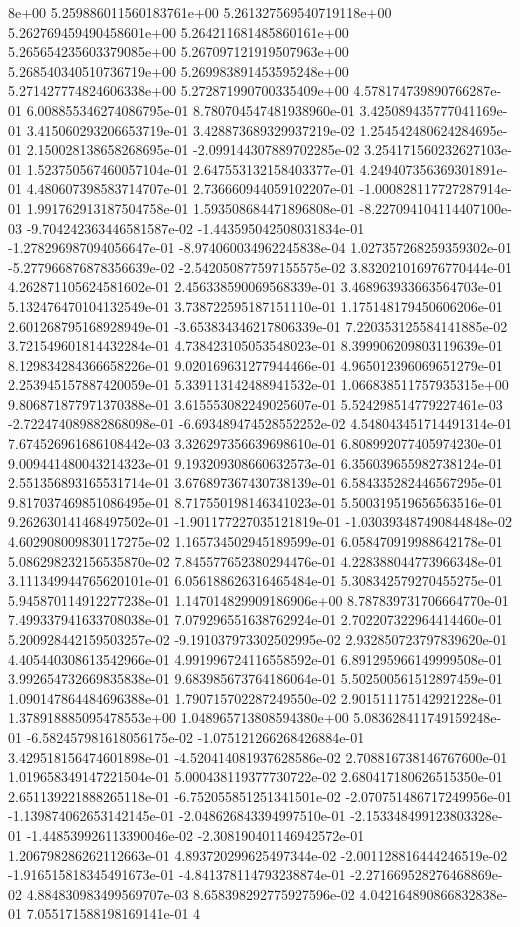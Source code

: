8e+00	5.259886011560183761e+00	5.261327569540719118e+00	5.262769459490458601e+00	5.264211681485860161e+00	5.265654235603379085e+00	5.267097121919507963e+00	5.268540340510736719e+00	5.269983891453595248e+00	5.271427774824606338e+00	5.272871990700335409e+00
4.578174739890766287e-01	6.008855346274086795e-01	8.780704547481938960e-01	3.425089435777041169e-01	3.415060293206653719e-01	3.428873689329937219e-02	1.254542480624284695e-01	2.150028138658268695e-01	-2.099144307889702285e-02	3.254171560232627103e-01	1.523750567460057104e-01	2.647553132158403377e-01	4.249407356369301891e-01	4.480607398583714707e-01	2.736660944059102207e-01	-1.000828117727287914e-01	1.991762913187504758e-01	1.593508684471896808e-01	-8.227094104114407100e-03	-9.704242363446581587e-02	-1.443595042508031834e-01	-1.278296987094056647e-01	-8.974060034962245838e-04	1.027357268259359302e-01	-5.277966876878356639e-02	-2.542050877597155575e-02	3.832021016976770444e-01	4.262871105624581602e-01	2.456338590069568339e-01	3.468963933663564703e-01	5.132476470104132549e-01	3.738722595187151110e-01	1.175148179450606206e-01	2.601268795168928949e-01	-3.653834346217806339e-01	7.220353125584141885e-02	3.721549601814432284e-01	4.738423105053548023e-01	8.399906209803119639e-01	8.129834284366658226e-01	9.020169631277944466e-01	4.965012396069651279e-01	2.253945157887420059e-01	5.339113142488941532e-01	1.066838511757935315e+00	9.806871877971370388e-01	3.615553082249025607e-01	5.524298514779227461e-03	-2.722474089882868098e-01	-6.693489474528552252e-02	4.548043451714491314e-01	7.674526961686108442e-03	3.326297356639698610e-01	6.808992077405974230e-01	9.009441480043214323e-01	9.193209308660632573e-01	6.356039655982738124e-01	2.551356893165531714e-01	3.676897367430738139e-01	6.584335282446567295e-01	9.817037469851086495e-01	8.717550198146341023e-01	5.500319519656563516e-01	9.262630141468497502e-01	-1.901177227035121819e-01	-1.030393487490844848e-02	4.602908009830117275e-02	1.165734502945189599e-01	6.058470919988642178e-01	5.086298232156535870e-02	7.845577652380294476e-01	4.228388044773966348e-01	3.111349944765620101e-01	6.056188626316465484e-01	5.308342579270455275e-01	5.945870114912277238e-01	1.147014829909186906e+00	8.787839731706664770e-01	7.499337941633708038e-01	7.079296551638762924e-01	2.702207322964414460e-01	5.200928442159503257e-02	-9.191037973302502995e-02	2.932850723797839620e-01	4.405440308613542966e-01	4.991996724116558592e-01	6.891295966149999508e-01	3.992654732669835838e-01	9.683985673764186064e-01	5.502500561512897459e-01	1.090147864484696388e-01	1.790715702287249550e-02	2.901511175142921228e-01	1.378918885095478553e+00	1.048965713808594380e+00	5.083628411749159248e-01	-6.582457981618056175e-02	-1.075121266268426884e-01	3.429518156474601898e-01	-4.520414081937628586e-02	2.708816738146767600e-01	1.019658349147221504e-01	5.000438119377730722e-02	2.680417180626515350e-01	2.651139221888265118e-01	-6.752055851251341501e-02	-2.070751486717249956e-01	-1.139874062653142145e-01	-2.048626843394997510e-01	-2.153348499123803328e-01	-1.448539926113390046e-02	-2.308190401146942572e-01	1.206798286262112663e-01	4.893720299625497344e-02	-2.001128816444246519e-02	-1.916515818345491673e-01	-4.841378114793238874e-01	-2.271669528276468869e-02	4.884830983499569707e-03	8.658398292775927596e-02	4.042164890866832838e-01	7.055171588198169141e-01	4